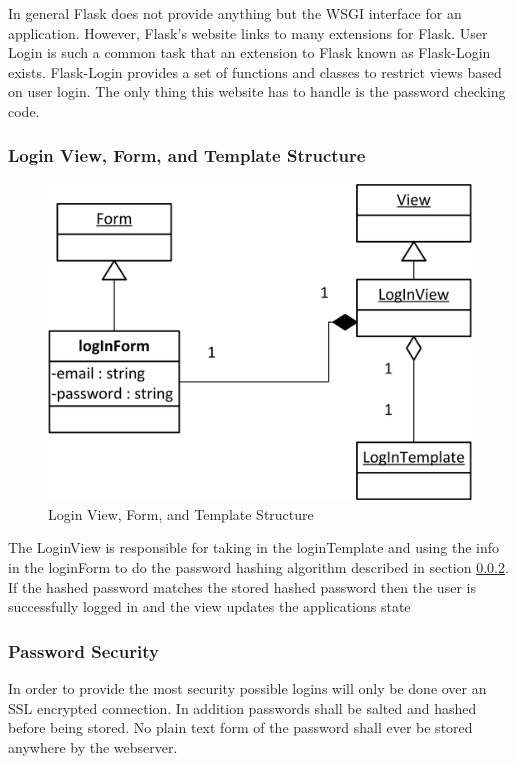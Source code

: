 \documentclass{article}
\begin{document}
In general Flask does not provide anything but the WSGI interface for an application. However, Flask's website links to many
extensions for Flask. User Login is such a common task that an extension to Flask known as Flask-Login exists. \cite{_flask-login} Flask-Login provides a set of functions and classes to restrict views based on user login. The only thing this website has to handle is the password checking code.

\subsubsection{Login View, Form, and Template Structure}
\FloatBarrier
\begin{figure}[h!]
\centering
\includegraphics[scale=.65]{img/viewFormTemplateDiagrams/logIn}
\caption{Login View, Form, and Template Structure}
\label{fig:loginViewFormTemplateStructureDiagram}
\end{figure}
\FloatBarrier

The LoginView is responsible for taking in the loginTemplate and using the info in the loginForm to do the password hashing algorithm described in section \ref{sec:passwordSecurity}. If the hashed password matches the stored hashed password then the user is successfully logged in and the view updates the applications state

\subsubsection{Password Security}
\label{sec:passwordSecurity}

In order to provide the most security possible logins will only be done over an SSL encrypted connection. In addition passwords shall be salted and hashed before being stored. No plain text form of the password shall ever be stored anywhere by the webserver.
\end{document}
